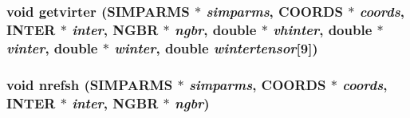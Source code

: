 \subsubsection{\setlength{\rightskip}{0pt plus 5cm}void getvirter ({\bf SIMPARMS} $\ast$ {\em simparms}, {\bf COORDS} $\ast$ {\em coords}, {\bf INTER} $\ast$ {\em inter}, {\bf NGBR} $\ast$ {\em ngbr}, double $\ast$ {\em vhinter}, double $\ast$ {\em vinter}, double $\ast$ {\em winter}, double {\em wintertensor}[9])}\label{md__finter_8c_a468767e9e04e5ab720be4538731daa4}


\subsubsection{\setlength{\rightskip}{0pt plus 5cm}void nrefsh ({\bf SIMPARMS} $\ast$ {\em simparms}, {\bf COORDS} $\ast$ {\em coords}, {\bf INTER} $\ast$ {\em inter}, {\bf NGBR} $\ast$ {\em ngbr})}\label{md__finter_8c_2a9f1606c7429c9a3b2b44116106ae4d}


